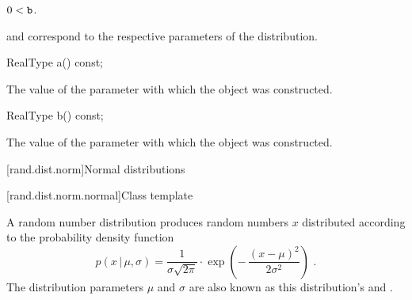 \begin{itemdescr}
\pnum
\expects
$0 < \texttt{b}$.

\pnum
\remarks
{} and 
correspond to the respective parameters of the distribution.
\end{itemdescr}

%
\begin{itemdecl}
RealType a() const;
\end{itemdecl}

\begin{itemdescr}
\pnum
\returns
The value of the  parameter
 with which the object was constructed.
\end{itemdescr}

%
\begin{itemdecl}
RealType b() const;
\end{itemdecl}

\begin{itemdescr}
\pnum
\returns
The value of the  parameter
 with which the object was constructed.
\end{itemdescr}%
%



[rand.dist.norm]{Normal distributions}%
%


[rand.dist.norm.normal]{Class template }%
%
%

\pnum
A  random number distribution
produces random numbers $x$
distributed according to
the probability density function%
%
%
\[%
 p(x\,|\,\mu,\sigma)
      = \frac{1}{\sigma \sqrt{2\pi}}
        \cdot
        \exp{\left(- \, \frac{(x - \mu)^2}
                             {2 \sigma^2}
             \right)
            }
 \text{ .}
\]
The distribution parameters $\mu$ and $\sigma$
are also known as this distribution's %
%
and %
%
%
.

